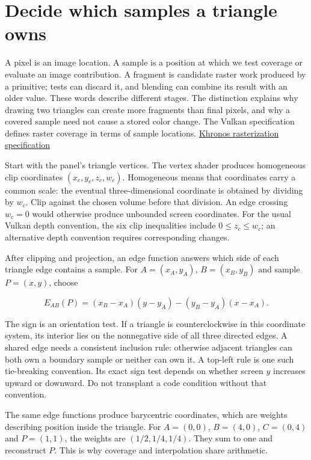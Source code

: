 \section{Decide which samples a triangle owns}\label{03-visual-computing-i-ch012-decide-which-samples-a-triangle-owns}

A pixel is an image location. A sample is a position at which we test coverage or evaluate an image contribution. A fragment is candidate raster work produced by a primitive; tests can discard it, and blending can combine its result with an older value. These words describe different stages. The distinction explains why drawing two triangles can create more fragments than final pixels, and why a covered sample need not cause a stored color change. The Vulkan specification defines raster coverage in terms of sample locations. \href{https://docs.vulkan.org/spec/latest/chapters/primsrast.html}{Khronos rasterization specification}

Start with the panel's triangle vertices. The vertex shader produces homogeneous clip coordinates \((x_c,y_c,z_c,w_c)\). Homogeneous means that coordinates carry a common scale: the eventual three-dimensional coordinate is obtained by dividing by \(w_c\). Clip against the chosen volume before that division. An edge crossing \(w_c=0\) would otherwise produce unbounded screen coordinates. For the usual Vulkan depth convention, the six clip inequalities include \(0\le z_c\le w_c\); an alternative depth convention requires corresponding changes.

After clipping and projection, an edge function answers which side of each triangle edge contains a sample. For \(A=(x_A,y_A)\), \(B=(x_B,y_B)\) and sample \(P=(x,y)\), choose

\[
E_{AB}(P)=(x_B-x_A)(y-y_A)-(y_B-y_A)(x-x_A).
\]

The sign is an orientation test. If a triangle is counterclockwise in this coordinate system, its interior lies on the nonnegative side of all three directed edges. A shared edge needs a consistent inclusion rule: otherwise adjacent triangles can both own a boundary sample or neither can own it. A top-left rule is one such tie-breaking convention. Its exact sign test depends on whether screen \(y\) increases upward or downward. Do not transplant a code condition without that convention.

The same edge functions produce barycentric coordinates, which are weights describing position inside the triangle. For \(A=(0,0)\), \(B=(4,0)\), \(C=(0,4)\) and \(P=(1,1)\), the weights are \((1/2,1/4,1/4)\). They sum to one and reconstruct \(P\). This is why coverage and interpolation share arithmetic.

